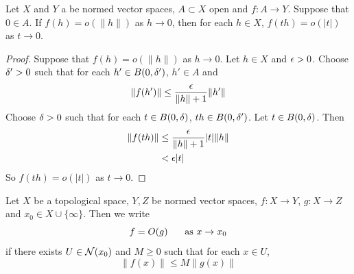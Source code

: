 \documentclass{book}
\begin{document}
\begin{ex} \lex{}
	Let $X$ and $Y$ a be normed vector spaces, $A \subset X$ open and $f:A \rightarrow Y$. Suppose that $0 \in A$. If $f(h) = o(\|h\|)$ as $h \rightarrow 0$, then for each $h \in X$,  $f(th) = o(|t|)$ as $t \rightarrow 0$.
\end{ex}	

\begin{proof}
	Suppose that $f(h) = o(\|h\|)$ as $h \rightarrow 0$.  Let $h \in X$ and $\epsilon >0$. Choose $\delta' >0 $ such that for each $h' \in B(0, \delta')$, $h' \in A$ and 
	$$\|f(h')\| \leq \frac{\epsilon}{\|h\|+1} \|h'\|$$ 
	Choose $\delta >0$ such that for each $t \in B(0,\delta)$, $th \in B(0,\delta')$. Let $t \in B(0,\delta)$. Then 
	\begin{align*}
		\|f(th)\| 
		&\leq \frac{\epsilon}{\|h\|+1} |t|\|h\| \\
		&< \epsilon |t|
	\end{align*}
	So $f(th) = o(|t|)$ as $t \rightarrow 0$.
\end{proof}		




\begin{defn} \ld{}
	Let $X$ be a topological space, $Y, Z$ be normed vector spaces, $f:X \rightarrow Y$, $g: X \rightarrow Z$ and $x_0 \in X \cup \{\infty\}$. Then we write $$f = O(g) \hspace{.5cm} \text{ as } x \rightarrow x_0$$ if there exists $U \in \mathcal{N}(x_0)$ and $M \geq 0$ such that for each $x \in U$, $$\|f(x)\| \leq M\|g(x)\|$$
\end{defn}
\end{document}
